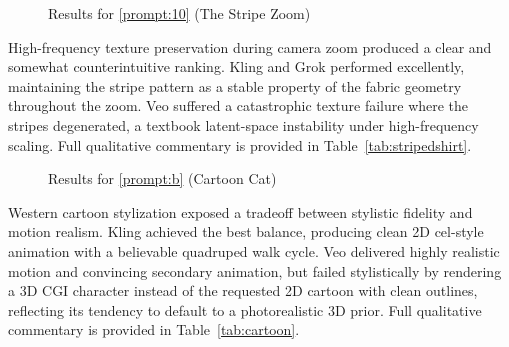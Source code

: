 \documentclass[sigconf]{acmart}
\begin{document}
\begin{figure}[H]
    \centering
    \caption{Results for \ref{prompt:10} (The Stripe Zoom)}
    \label{fig:eval_prompt_4}
\end{figure}

\noindent High-frequency texture preservation during camera zoom produced a clear and somewhat counterintuitive ranking. Kling and Grok performed excellently, maintaining the stripe pattern as a stable property of the fabric geometry throughout the zoom. Veo suffered a catastrophic texture failure where the stripes degenerated, a textbook latent-space instability under high-frequency scaling. Full qualitative commentary is provided in Table~\ref{tab:stripedshirt}.


\begin{figure}[H]
    \centering
    \caption{Results for \ref{prompt:b} (Cartoon Cat)}
    \label{fig:eval_prompt_5}
\end{figure}

\noindent Western cartoon stylization exposed a tradeoff between stylistic fidelity and motion realism. Kling achieved the best balance, producing clean 2D cel-style animation with a believable quadruped walk cycle. Veo delivered highly realistic motion and convincing secondary animation, but failed stylistically by rendering a 3D CGI character instead of the requested 2D cartoon with clean outlines, reflecting its tendency to default to a photorealistic 3D prior. Full qualitative commentary is provided in Table~\ref{tab:cartoon}.
\end{document}
